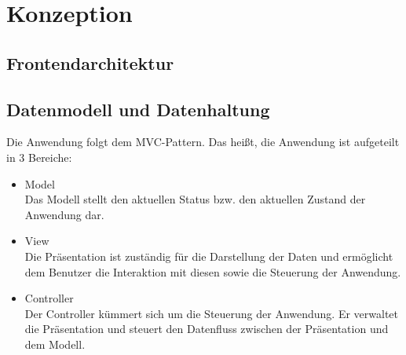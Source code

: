\chapter{Konzeption}
\section{Frontendarchitektur}
\section{Datenmodell und Datenhaltung}

Die Anwendung folgt dem \ac{MVC}-Pattern. Das heißt, die Anwendung ist aufgeteilt in 3 Bereiche:
\begin{itemize}%
    \item Model\\
        Das Modell stellt den aktuellen Status bzw. den aktuellen Zustand der Anwendung dar.
    \item View\\
        Die Präsentation ist zuständig für die Darstellung der Daten und ermöglicht dem Benutzer die Interaktion mit diesen sowie die Steuerung der Anwendung.
    \item Controller\\
        Der Controller kümmert sich um die Steuerung der Anwendung. Er verwaltet die Präsentation und steuert den Datenfluss zwischen der Präsentation und dem Modell.
\end{itemize}


